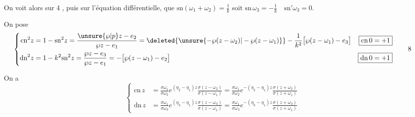 On voit alors sur 4 , puis sur l'équation différentielle, que $\mathrm{sn}(\omega_1+\omega_2)=\frac1k$ soit \uline{$\mathrm{sn}\,\omega_3=-\frac1k\quad\mathrm{sn}'\omega_3=0$}.

On pose
\[
\left\{\begin{aligned}
\mathrm{cn}^2z&=1-\mathrm{sn}^2z=\frac{\unsure{\wp|p}z-e_2}{\wp z-e_1}=\deleted{\unsure{-\wp(z-\omega_2)|-\wp(z-\omega_1)}}-\frac1{k^2}\bigl[\wp(z-\omega_1)-e_3\bigr]
&\boxed{\mathrm{cn}\,0=+1}\\
\mathrm{dn}^2z&=1-k^2\mathrm{sn}^2z=\frac{\wp z-e_3}{\wp z-e_1}=-\bigl[\wp(z-\omega_1)-e_2\bigr]
&\boxed{\mathrm{dn}\,0=+1}
\end{aligned}\right. \tag*{8}
\]

On a
\[
\left\{\begin{aligned}
\mathrm{cn}\,z&=\frac{\sigma\omega_1}{\sigma\omega_2}e^{(\eta_{2}-\eta_1)z}\frac{\sigma(z-\omega_2)}{\sigma(z-\omega_1)}
=\frac{\sigma\omega_1}{\sigma\omega_2}e^{-(\eta_2-\eta_1)z}\frac{\sigma(z+\omega_2)}{\sigma(z+\omega_1)}\\
\mathrm{dn}\,z&=\frac{\sigma\omega_1}{\sigma\omega_3}e^{(\eta_3-\eta_1)z}\frac{\sigma(z-\omega_3)}{\sigma(z-\omega_1)}
=\frac{\sigma\omega_1}{\sigma\omega_3}e^{-(\eta_3-\eta_1)z}\frac{\sigma(z+\omega_3)}{\sigma(z+\omega_1)}
\end{aligned}\right. \tag*{9}
\]

